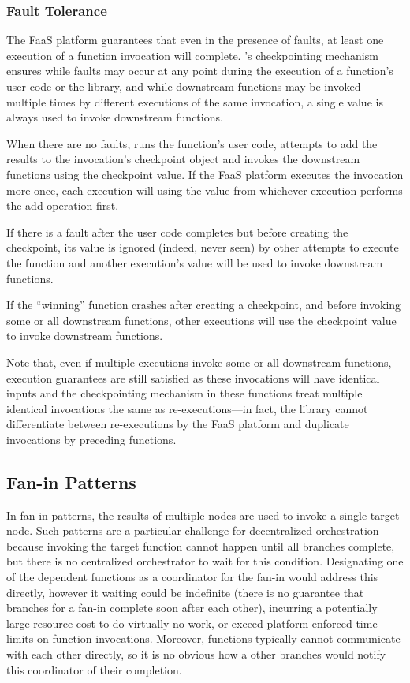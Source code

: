 \subsubsection{Fault Tolerance}

The FaaS platform guarantees that even in the presence of faults, at least one
execution of a function invocation will complete. \name{}'s checkpointing
mechanism ensures while faults may occur at any point during the execution of a
function's user code or the \name{} library, and while downstream functions may
be invoked multiple times by different executions of the same invocation, a
single value is always used to invoke downstream functions.

When there are no faults, \name{} runs the function's user code, attempts to add
the results to the invocation's checkpoint object and invokes the downstream
functions using the checkpoint value. If the FaaS platform executes the
invocation more once, each execution will using the value from whichever
execution performs the add operation first.

If there is a fault after the user code completes but before creating the
checkpoint, its value is ignored (indeed, never seen) by other attempts to
execute the function and another execution's value will be used to invoke
downstream functions.

If the ``winning'' function crashes after creating a checkpoint, and before
invoking some or all downstream functions, other executions will use the
checkpoint value to invoke downstream functions.

Note that, even if multiple executions invoke some or all downstream functions,
execution guarantees are still satisfied as these invocations will have
identical inputs and the checkpointing mechanism in these functions treat
multiple identical invocations the same as re-executions---in fact, the \name{}
library cannot differentiate between re-executions by the FaaS platform and
duplicate invocations by preceding functions.

\subsection{Fan-in Patterns}\label{sec:design:fanin}

In fan-in patterns, the results of multiple nodes are used to invoke a single
target node. Such patterns are a particular challenge for decentralized
orchestration because invoking the target function cannot happen until all
branches complete, but there is no centralized orchestrator to wait for this
condition. Designating one of the dependent functions as a coordinator for the
fan-in would address this directly, however it waiting could be indefinite
(there is no guarantee that branches for a fan-in complete soon after each
other), incurring a potentially large resource cost to do virtually no work, or
exceed platform enforced time limits on function invocations. Moreover,
functions typically cannot communicate with each other directly, so it is no
obvious how a other branches would notify this coordinator of their completion.

